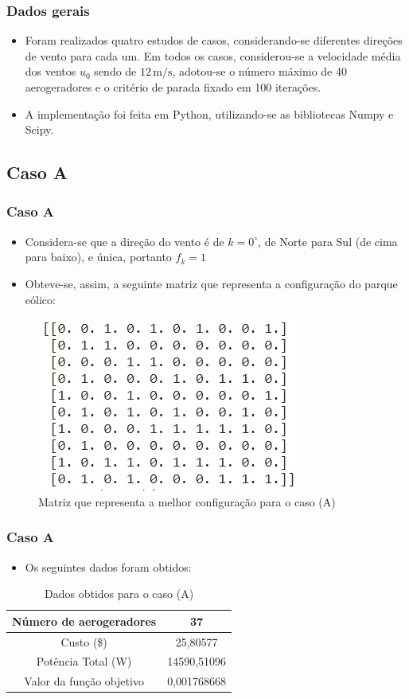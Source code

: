 \documentclass{beamer}
\begin{document}
	\begin{frame}
		\frametitle{Dados gerais}
		\begin{itemize}
			\item Foram realizados quatro estudos de casos, considerando-se diferentes direções de vento para cada um. Em todos os casos, considerou-se a velocidade média dos ventos $ u_0 $ sendo de $ 12 \, \si{\meter/\second} $, adotou-se o número máximo de 40 aerogeradores e o critério de parada fixado em 100 iterações. 
			\item A implementação foi feita em Python, utilizando-se as bibliotecas Numpy e Scipy.
		\end{itemize}
	\end{frame}
	
	\subsection{Caso A}
	\begin{frame}
		\frametitle{Caso A}
		\begin{itemize}
			\item Considera-se que a direção do vento é de $ k = 0^{\circ} $, de Norte para Sul (de cima para baixo), e única, portanto $ f_k = 1 $
			\item Obteve-se, assim, a seguinte matriz que representa a configuração do parque eólico:
		\end{itemize}
		\begin{figure}[H]
			\centering
			\includegraphics[width=0.5\linewidth]{caso_a}
			\caption{Matriz que representa a melhor configuração para o caso (A)}
			\label{fig:casoa}
		\end{figure}
	\end{frame}

	\begin{frame}
		\frametitle{Caso A}
		\begin{itemize}
			\item Os seguintes dados foram obtidos:
		\end{itemize}
		\begin{table}[H]
			\centering
			\begin{tabular}{|c|c|}
				\hline
				Número de aerogeradores & 37 \\
				\hline
				Custo (\$) & 25,80577 \\
				\hline
				Potência Total (W) & 14590,51096 \\
				\hline
				Valor da função objetivo &  0,001768668\\
				\hline
			\end{tabular}
			\caption{Dados obtidos para o caso (A)}
			\label{tab:casoa}
		\end{table}	
	\end{frame}
	
\end{document}

